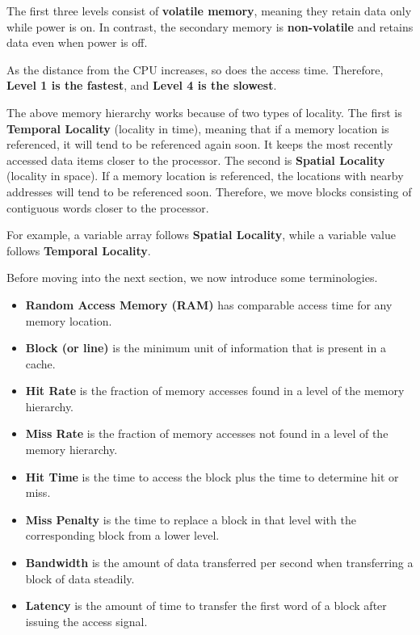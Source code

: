The first three levels consist of \textbf{volatile memory}, meaning they retain data only while power is on. In contrast, the secondary memory is \textbf{non-volatile} and retains data even when power is off.

As the distance from the CPU increases, so does the access time. Therefore, \textbf{Level 1 is the fastest}, and \textbf{Level 4 is the slowest}.

The above memory hierarchy works because of two types of locality. The first is \textbf{Temporal Locality} (locality in time), meaning that if a memory location is referenced, it will tend to be referenced again soon. It keeps the most recently accessed data items closer to the processor. The second is \textbf{Spatial Locality} (locality in space). If a memory location is referenced, the locations with nearby addresses will tend to be referenced soon. Therefore, we move blocks consisting of contiguous words closer to the processor.

For example, a variable array follows \textbf{Spatial Locality}, while a variable value follows \textbf{Temporal Locality}. 

Before moving into the next section, we now introduce some terminologies.

\begin{itemize}
  \item \textbf{Random Access Memory (RAM)} has comparable access time for any memory location.
  \item \textbf{Block (or line)} is the minimum unit of information that is present in a cache.
  \item \textbf{Hit Rate} is the fraction of memory accesses found in a level of the memory hierarchy.
  \item \textbf{Miss Rate} is the fraction of memory accesses not found in a level of the memory hierarchy.
  \item \textbf{Hit Time} is the time to access the block plus the time to determine hit or miss.
  \item \textbf{Miss Penalty} is the time to replace a block in that level with the corresponding block from a lower level.
  \item \textbf{Bandwidth} is the amount of data transferred per second when transferring a block of data steadily.
  \item \textbf{Latency} is the amount of time to transfer the first word of a block after issuing the access signal.
\end{itemize}

